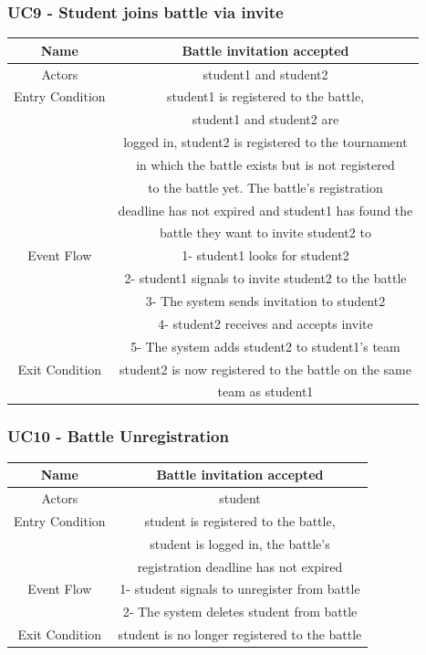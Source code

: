 \documentclass{article}
\begin{document}
\subsubsection*{UC9 - Student joins battle via invite}

\begin{tabular*}{\linewidth}{@{\extracolsep{\fill}} cc }
    \hline
    Name & Battle invitation accepted \\ 
    \hline
    Actors & student1 and student2\\ 
    \hline
    Entry Condition & student1 is registered to the battle,\\
                    & student1 and student2 are \\
                    & logged in, student2 is registered to the tournament\\
                    & in which the battle exists but is not registered\\
                    & to the battle yet. The battle's registration\\
                    & deadline has not expired and student1 has found the\\
                    & battle they want to invite student2 to\\
    \hline
    Event Flow & 1- student1 looks for student2\\
               & 2- student1 signals to invite student2 to the battle\\
               & 3- The system sends invitation to student2\\ 
               & 4- student2 receives and accepts invite\\
               & 5- The system adds student2 to student1's team\\
    \hline
    Exit Condition & student2 is now registered to the battle on the same\\
                   & team as student1\\
    \hline
\end{tabular*}

\subsubsection*{UC10 - Battle Unregistration}

\begin{tabular*}{\linewidth}{@{\extracolsep{\fill}} cc }
    \hline
    Name & Battle invitation accepted \\ 
    \hline
    Actors & student\\
    \hline
    Entry Condition & student is registered to the battle,\\
                    & student is logged in, the battle's \\
                    & registration deadline has not expired\\
    \hline
    Event Flow & 1- student signals to unregister from battle\\
               & 2- The system deletes student from battle\\
    \hline
    Exit Condition & student is no longer registered to the battle\\
    \hline
\end{tabular*}
\end{document}
